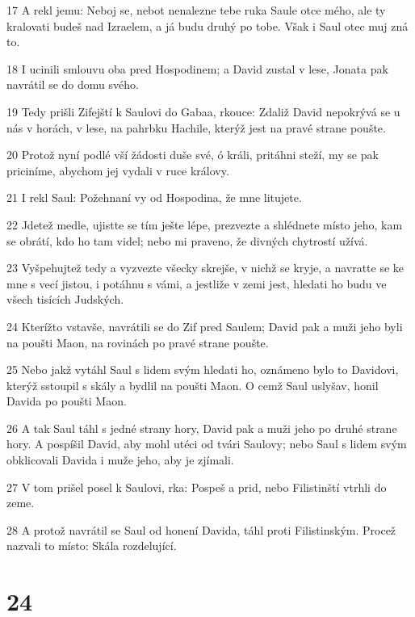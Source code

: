 \par 17 A rekl jemu: Neboj se, nebot nenalezne tebe ruka Saule otce mého, ale ty kralovati budeš nad Izraelem, a já budu druhý po tobe. Však i Saul otec muj zná to.
\par 18 I ucinili smlouvu oba pred Hospodinem; a David zustal v lese, Jonata pak navrátil se do domu svého.
\par 19 Tedy prišli Zifejští k Saulovi do Gabaa, rkouce: Zdaliž David nepokrývá se u nás v horách, v lese, na pahrbku Hachile, kterýž jest na pravé strane poušte.
\par 20 Protož nyní podlé vší žádosti duše své, ó králi, pritáhni steží, my se pak priciníme, abychom jej vydali v ruce královy.
\par 21 I rekl Saul: Požehnaní vy od Hospodina, že mne litujete.
\par 22 Jdetež medle, ujistte se tím ješte lépe, prezvezte a shlédnete místo jeho, kam se obrátí, kdo ho tam videl; nebo mi praveno, že divných chytrostí užívá.
\par 23 Vyšpehujtež tedy a vyzvezte všecky skrejše, v nichž se kryje, a navratte se ke mne s vecí jistou, i potáhnu s vámi, a jestliže v zemi jest, hledati ho budu ve všech tisících Judských.
\par 24 Kterížto vstavše, navrátili se do Zif pred Saulem; David pak a muži jeho byli na poušti Maon, na rovinách po pravé strane poušte.
\par 25 Nebo jakž vytáhl Saul s lidem svým hledati ho, oznámeno bylo to Davidovi, kterýž sstoupil s skály a bydlil na poušti Maon. O cemž Saul uslyšav, honil Davida po poušti Maon.
\par 26 A tak Saul táhl s jedné strany hory, David pak a muži jeho po druhé strane hory. A pospíšil David, aby mohl utéci od tvári Saulovy; nebo Saul s lidem svým obklicovali Davida i muže jeho, aby je zjímali.
\par 27 V tom prišel posel k Saulovi, rka: Pospeš a prid, nebo Filistinští vtrhli do zeme.
\par 28 A protož navrátil se Saul od honení Davida, táhl proti Filistinským. Procež nazvali to místo: Skála rozdelující.

\chapter{24}

